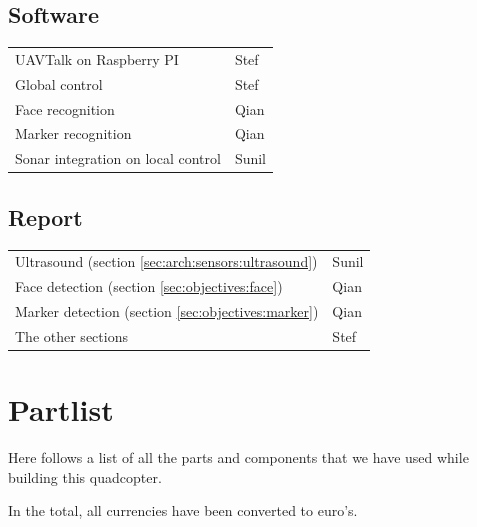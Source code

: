 \documentclass[11pt, a4paper, onecolumn, oneside, parskip=half]{scrartcl}
\begin{document}
\subsection{Software}
\begin{tabular}{ll}
UAVTalk on Raspberry PI & Stef \\
Global control & Stef \\
Face recognition & Qian \\
Marker recognition & Qian \\
Sonar integration on local control & Sunil \\
\end{tabular}

\subsection{Report}
\begin{tabular}{ll}
Ultrasound (section \ref{sec:arch:sensors:ultrasound}) & Sunil \\
Face detection (section \ref{sec:objectives:face}) & Qian \\
Marker detection (section \ref{sec:objectives:marker}) & Qian \\
The other sections & Stef \\
\end{tabular}

\newpage
\section{Partlist}
Here follows a list of all the parts and components that we have used while building this quadcopter.

In the total, all currencies have been converted to euro's.
\end{document}

